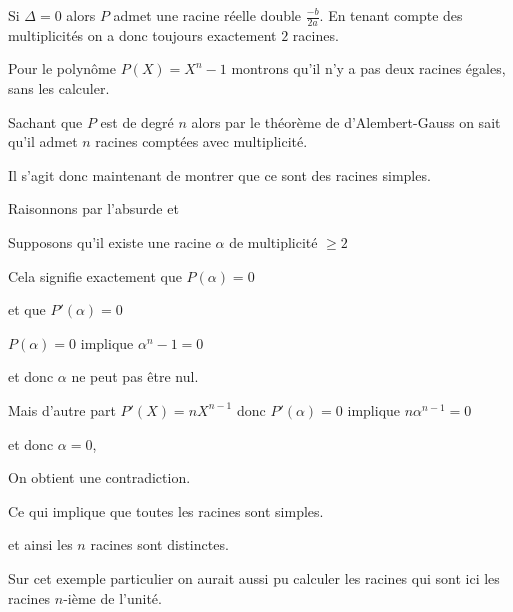 \change

Si $\Delta = 0$ alors $P$ admet une racine réelle double $\frac{-b}{2a}$.
En tenant compte des multiplicités on a donc toujours exactement $2$ racines.



\diapo

Pour le polynôme $P(X)=X^n-1$ montrons qu'il n'y a pas deux racines égales,
sans les calculer.

\change

Sachant que $P$ est de degré $n$ alors par le théorème de d'Alembert-Gauss
on sait qu'il admet $n$ racines comptées avec multiplicité. 

\change

Il s'agit donc maintenant de montrer que ce sont des racines simples.

\change

Raisonnons par l'absurde et 

\change

Supposons qu'il existe une racine $\alpha$ de multiplicité $\ge 2$

\change

Cela signifie exactement que  $P(\alpha)=0$

\change

et que $P'(\alpha)=0$

\change

$P(\alpha)=0$ implique $\alpha^n-1=0$ 

\change

et donc $\alpha$ ne peut pas être nul.

\change

Mais d'autre part $P'(X) = n X^{n-1}$ donc
$P'(\alpha)=0$ 
implique $n\alpha^{n-1}=0$ 

\change

et donc $\alpha=0$,


\change

On obtient une contradiction.


\change

Ce qui implique que toutes les racines sont simples.

\change

et ainsi les $n$ racines sont distinctes.

Sur cet exemple particulier on aurait aussi pu calculer les racines 
qui sont ici les racines $n$-ième de l'unité.

\diapo

